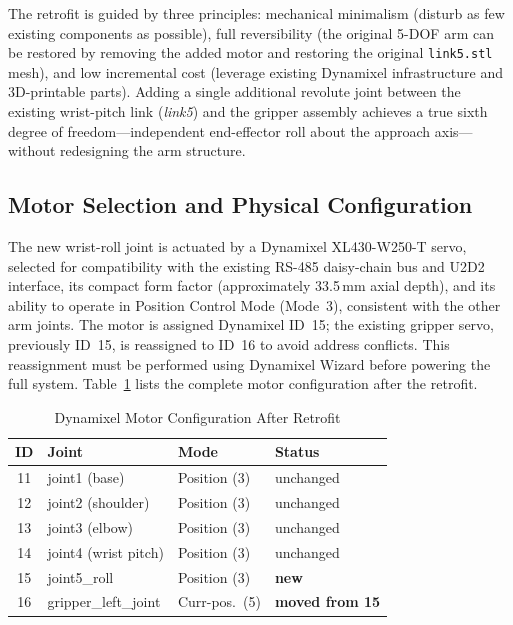\documentclass[conference]{IEEEtran}
\begin{document}
	The retrofit is guided by three principles: mechanical minimalism
	(disturb as few existing components as possible), full reversibility
	(the original 5-DOF arm can be restored by removing the added motor
	and restoring the original \texttt{link5.stl} mesh), and low
	incremental cost (leverage existing Dynamixel infrastructure and
	3D-printable parts). Adding a single additional revolute joint between
	the existing wrist-pitch link (\textit{link5}) and the gripper assembly
	achieves a true sixth degree of freedom---independent end-effector roll
	about the approach axis---without redesigning the arm structure.
	
	\subsection{Motor Selection and Physical Configuration}
	
	The new wrist-roll joint is actuated by a Dynamixel XL430-W250-T
	servo, selected for compatibility with the existing RS-485 daisy-chain
	bus and U2D2 interface, its compact form factor (approximately
	33.5\,mm axial depth), and its ability to operate in Position Control
	Mode (Mode~3), consistent with the other arm joints. The motor is
	assigned Dynamixel ID~15; the existing gripper servo, previously
	ID~15, is reassigned to ID~16 to avoid address conflicts. This
	reassignment must be performed using Dynamixel Wizard before powering
	the full system. Table~\ref{tab:motors} lists the complete motor
	configuration after the retrofit.
	
	\begin{table}[t]
		\centering
		\caption{Dynamixel Motor Configuration After Retrofit}
		\label{tab:motors}
		\renewcommand{\arraystretch}{1.2}
		\footnotesize
		\begin{tabular}{clll}
			\toprule
			\textbf{ID} & \textbf{Joint} & \textbf{Mode} & \textbf{Status} \\
			\midrule
			11 & joint1 (base)        & Position (3)   & unchanged \\
			12 & joint2 (shoulder)    & Position (3)   & unchanged \\
			13 & joint3 (elbow)       & Position (3)   & unchanged \\
			14 & joint4 (wrist pitch) & Position (3)   & unchanged \\
			15 & joint5\_roll         & Position (3)   & \textbf{new} \\
			16 & gripper\_left\_joint & Curr-pos.\ (5) & \textbf{moved from 15} \\
			\bottomrule
		\end{tabular}
	\end{table}
	
\end{document}
